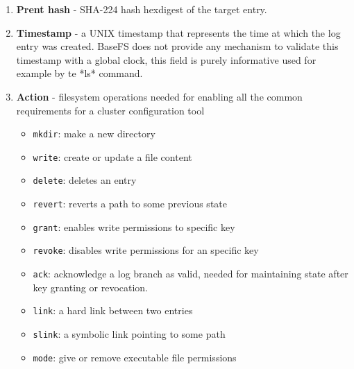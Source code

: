 \documentclass{sig-alternate}
\begin{document}
\begin{enumerate}
\item \textbf{Prent hash} - SHA-224 hash hexdigest of the target entry. 
\item \textbf{Timestamp} - a UNIX timestamp that represents the time at which the log entry was created. BaseFS does not provide any mechanism to validate this timestamp with a global clock, this field is purely informative used for example by te *ls* command.
\item \textbf{Action} - filesystem operations needed for enabling all the common requirements for a cluster configuration tool
    \begin{itemize}
    \item \texttt{mkdir}: make a new directory
    \item \texttt{write}: create or update a file content
    \item \texttt{delete}: deletes an entry
    \item \texttt{revert}: reverts a path to some previous state
    \item \texttt{grant}: enables write permissions to specific key
    \item \texttt{revoke}: disables write permissions for an specific key
    \item \texttt{ack}: acknowledge a log branch as valid, needed for maintaining state after key granting or revocation.
    \item \texttt{link}: a hard link between two entries
    \item \texttt{slink}: a symbolic link pointing to some path
    \item \texttt{mode}: give or remove executable file permissions
    \end{itemize}


\end{enumerate}
\end{document}
